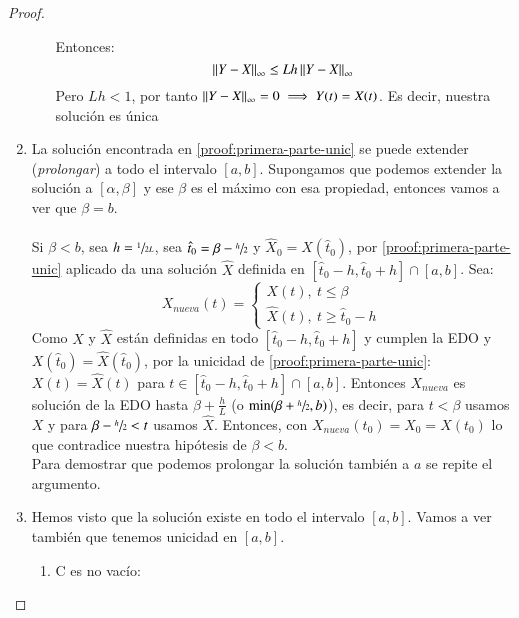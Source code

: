\begin{proof}
\begin{enumerate}
\begin{enumerate}
        Entonces:
        $$
            \left|\left|Y-X\right|\right|_\infty \leq Lh \left|\left|Y-X\right|\right|_\infty
        $$
        Pero $Lh < 1$, por tanto $\left|\left|Y-X\right|\right|_\infty = 0 \implies Y(t) = X(t)$. Es decir, nuestra solución es única
    \end{enumerate}
        \item La solución encontrada en \ref{proof:primera-parte-unic} se puede extender (\textit{prolongar}) a todo el intervalo $[a, b]$.
        Supongamos que podemos extender la solución a $[\alpha, \beta]$ y ese $\beta$ es el máximo con esa propiedad, entonces vamos a ver que $\beta = b$.\\\\
        Si $\beta < b$, sea $h = \sfrac{1}{2L}$, sea $\hat{t}_0 = \beta - \sfrac{h}{2}$ y $\hat{X}_0 = X(\hat{t}_0)$, por \ref{proof:primera-parte-unic} aplicado da una solución $\hat{X}$ definida en $[\hat{t}_0 - h, \hat{t}_0 + h] \cap[a, b]$.
        Sea:
        $$
            X_{nueva}(t) =
            \begin{cases}
                X(t),\ t\leq \beta\\
                \hat{X}(t),\ t\geq \hat{t}_0 - h
        \end{cases}
        $$
        Como $X$ y $\hat{X}$ están definidas en todo $[\hat{t}_0 - h, \hat{t}_0 + h]$ y cumplen la EDO y $X(\hat{t}_0) = \hat{X}(\hat{t}_0)$, por la unicidad de  \ref{proof:primera-parte-unic}: $X(t) = \hat{X}(t) $ para $t \in [\hat{t}_0 - h, \hat{t}_0 + h] \cap[a, b]$.
        Entonces $X_{nueva}$ es solución de la EDO hasta $\beta + \frac{h}{L}$ (o $\min(\beta + \sfrac{h}{2}, b)$), es decir, para $t < \beta$ usamos $X$ y para $\beta - \sfrac{h}{2} < t$ usamos $\hat{X}$. Entonces, con $X_{nueva}(t_0) = X_0 = X(t_0)$ lo que contradice nuestra hipótesis de $\beta < b$.\\
        Para demostrar que podemos prolongar la solución también a $a$ se repite el argumento.
        \item Hemos visto que la solución existe en todo el intervalo $[a, b]$. Vamos a ver también que tenemos unicidad en $[a, b]$.
        \begin{enumerate}
        \item C es no vacío:

\end{enumerate}
\end{enumerate}
\end{proof}
